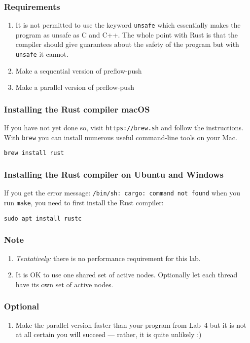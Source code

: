 \documentclass{forsete}
\begin{document}
\subsubsection*{Requirements}
\begin{enumerate}
\item It is not permitted to use the keyword \verb.unsafe. which essentially makes the program as unsafe as C and C++. The whole point with Rust is that the compiler should give guarantees about the safety of the program but with \verb.unsafe. it cannot.
\item Make a sequential version of preflow-push
\item Make a parallel version of preflow-push
\end{enumerate}

\subsubsection*{Installing the Rust compiler macOS}
If you have not yet done so, visit \verb!https://brew.sh! and follow the instructions. With \verb!brew! you 
can install numerous useful command-line tools on your Mac.
\begin{verbatim}
brew install rust
\end{verbatim}

\subsubsection*{Installing the Rust compiler on Ubuntu and Windows}
If you get the error message: \verb!/bin/sh: cargo: command not found! when you run \verb!make!, you need to 
first install the Rust compiler:
\begin{verbatim}
sudo apt install rustc
\end{verbatim}

\subsubsection*{Note}
\begin{enumerate}
\item {\em Tentatively:} there is no performance requirement for this lab. 
\item It is OK to use one shared set of active nodes. Optionally let each thread have
its own set of active nodes.
\end{enumerate}

\subsubsection*{Optional}
\begin{enumerate}
\item Make the parallel version faster than your program from Lab~4 but it is not at all certain you will succeed --- rather, it is quite unlikely :)
\end{enumerate}
\end{document}
